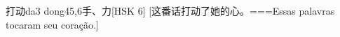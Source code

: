 \begin{EntryWithPhonetic}{打动}{da3 dong4}{5,6}{⼿、⼒}[HSK 6]
  [这番话打动了她的心。===Essas palavras tocaram seu coração.]
\end{EntryWithPhonetic}


